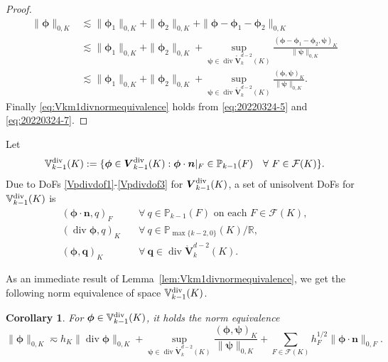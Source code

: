 \documentclass[10pt]{amsart}
\newtheorem{corollary}[theorem]{Corollary}
\newcommand{\bs}{\boldsymbol}
\renewcommand{\div}{\operatorname{div}}
\numberwithin{equation}{section}
\begin{document}
\begin{proof}
\begin{align*}  
\|\boldsymbol{\phi}\|_{0,K}&\lesssim \|\boldsymbol{\phi}_1\|_{0,K}+\|\boldsymbol{\phi}_2\|_{0,K}+\|\boldsymbol{\phi}-\boldsymbol{\phi}_1-\boldsymbol{\phi}_2\|_{0,K} \\
&\lesssim \|\boldsymbol{\phi}_1\|_{0,K}+\|\boldsymbol{\phi}_2\|_{0,K}+\sup_{\boldsymbol{\psi}\in\div\mathring{\boldsymbol{V}}_{k}^{d-2}(K)}\frac{(\boldsymbol{\phi}-\boldsymbol{\phi}_1-\boldsymbol{\phi}_2, \boldsymbol{\psi})_K}{\|\boldsymbol{\psi}\|_{0,K}} \\
&\lesssim \|\boldsymbol{\phi}_1\|_{0,K}+\|\boldsymbol{\phi}_2\|_{0,K}+\sup_{\boldsymbol{\psi}\in\div\mathring{\boldsymbol{V}}_{k}^{d-2}(K)}\frac{(\boldsymbol{\phi}, \boldsymbol{\psi})_K}{\|\boldsymbol{\psi}\|_{0,K}}.
\end{align*}
Finally \eqref{eq:Vkm1divnormequivalence} holds from \eqref{eq:20220324-5} and \eqref{eq:20220324-7}.
\end{proof}


Let 
$$
\mathbb{V}_{k-1}^{\rm div}(K):=\{\boldsymbol{\phi}\in\boldsymbol{V}_{k-1}^{\rm div}(K): \boldsymbol{\phi}\cdot\boldsymbol{n}|_F\in\mathbb P_{k-1}(F) \quad\forall~F\in\mathcal F(K)\}.
$$
Due to DoFs \eqref{Vpdivdof1}-\eqref{Vpdivdof3} for $\boldsymbol{V}_{k-1}^{\rm div}(K)$, a set of unisolvent DoFs for $\mathbb{V}_{k-1}^{\rm div}(K)$ is 
\begin{align}
    (\boldsymbol{\phi}\cdot\boldsymbol{n}, q)_F & \quad\forall~q\in\mathbb P_{k-1}(F) \textrm{ on each }  F\in\mathcal F(K), \label{Vpdivdof1}\\
    (\div\boldsymbol{\phi}, q)_K & \quad\forall~q\in\mathbb P_{\max\{k-2,0\}}(K)/\mathbb R, \label{Vpdivdof2} \\
    (\boldsymbol{\phi}, \bs q)_K & \quad\forall~\bs q\in \div\mathring{\boldsymbol{V}}_{k}^{d-2}(K). \label{Vpdivdof3}
\end{align}

As an immediate result of Lemma~\ref{lem:Vkm1divnormequivalence}, we get the following norm equivalence of space $\mathbb{V}_{k-1}^{\rm div}(K)$.
\begin{corollary}
For $\boldsymbol{\phi}\in\mathbb{V}_{k-1}^{\rm div}(K)$, it holds the norm equivalence
\begin{equation}\label{eq:Vkm1divnormequiv}
\|\boldsymbol{\phi}\|_{0,K}\eqsim h_K\|\div\boldsymbol{\phi}\|_{0,K} + \sup_{\boldsymbol{\psi}\in\div\mathring{\boldsymbol{V}}_{k}^{d-2}(K)}\frac{(\boldsymbol{\phi}, \boldsymbol{\psi})_K}{\|\boldsymbol{\psi}\|_{0,K}} +\sum_{F\in\mathcal F(K)}h_F^{1/2}\|\boldsymbol{\phi}\cdot\boldsymbol{n}\|_{0,F}.
\end{equation}
\end{corollary}
\end{document}
